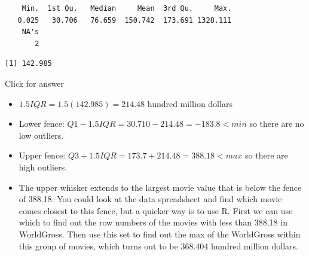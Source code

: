 \documentclass[
]{book}
\newenvironment{Shaded}{\begin{snugshade}}{\end{snugshade}}
\newcommand{\AttributeTok}[1]{\textcolor[rgb]{0.77,0.63,0.00}{#1}}
\newcommand{\ConstantTok}[1]{\textcolor[rgb]{0.00,0.00,0.00}{#1}}
\newcommand{\DecValTok}[1]{\textcolor[rgb]{0.00,0.00,0.81}{#1}}
\newcommand{\FloatTok}[1]{\textcolor[rgb]{0.00,0.00,0.81}{#1}}
\newcommand{\FunctionTok}[1]{\textcolor[rgb]{0.00,0.00,0.00}{#1}}
\newcommand{\NormalTok}[1]{#1}
\newcommand{\SpecialCharTok}[1]{\textcolor[rgb]{0.00,0.00,0.00}{#1}}
\begin{document}
\begin{verbatim}
    Min.  1st Qu.   Median     Mean  3rd Qu.     Max. 
   0.025   30.706   76.659  150.742  173.691 1328.111 
    NA's 
       2 
\end{verbatim}

\begin{Shaded}
\end{Shaded}

\begin{verbatim}
[1] 142.985
\end{verbatim}

Click for answer

\begin{itemize}
\item
  \(1.5IQR = 1.5(142.985) = 214.48\) hundred million dollars
\item
  Lower fence: \(Q1 - 1.5IQR = 30.710 - 214.48 = -183.8 < min\) so there are no low outliers.
\item
  Upper fence: \(Q3 + 1.5IQR = 173.7 + 214.48 = 388.18 < max\) so there are high outliers.
\item
  The upper whisker extends to the largest movie value that is below the fence of 388.18. You could look at the data spreadsheet and find which movie comes closest to this fence, but a quicker way is to use R. First we can use which to find out the row numbers of the movies with less than 388.18 in WorldGross. Then use this set to find out the max of the WorldGross within this group of movies, which turns out to be 368.404 hundred million dollars.
\end{itemize}

\begin{Shaded}
\end{Shaded}
\end{document}
